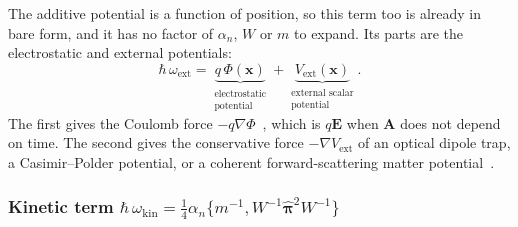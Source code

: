 \documentclass[aps,prd,onecolumn,tightenlines,nofootinbib,notitlepage,11pt,floatfix]{revtex4-2}
\theoremstyle{indentedtheorem}
\begin{document}
The additive potential is a function of position, so this term too is already in bare form, and it has no factor of $\alpha_n$, $W$ or $m$ to expand. Its parts are the electrostatic and external potentials:
\begin{equation}
    \hbar\,\omega_\text{ext} =
    \underbrace{q\,\Phi(\mathbf{x})}_{\substack{\text{electrostatic} \\ \text{potential}}}
    + \underbrace{V_\text{ext}(\mathbf{x})}_{\substack{\text{external scalar} \\ \text{potential}}} .
    \label{eq:ext_expanded}
\end{equation}
The first gives the Coulomb force $-q\nabla\Phi$~\citep{Coulomb1785Electricity}, which is $q\mathbf{E}$ when $\mathbf{A}$ does not depend on time. The second gives the conservative force $-\nabla V_\text{ext}$ of an optical dipole trap, a Casimir--Polder potential, or a coherent forward-scattering matter potential~\citep{Wolfenstein1978Neutrino,Grimm2000Optical}.

\subsubsection{Kinetic term \texorpdfstring{$\hbar\,\omega_\text{kin}=\tfrac{1}{4}\alpha_n\{m^{-1},W^{-1}\hat{\boldsymbol{\pi}}^2W^{-1}\}$}{hbar omega kin}}
\label{sec:term_kin}
\end{document}
